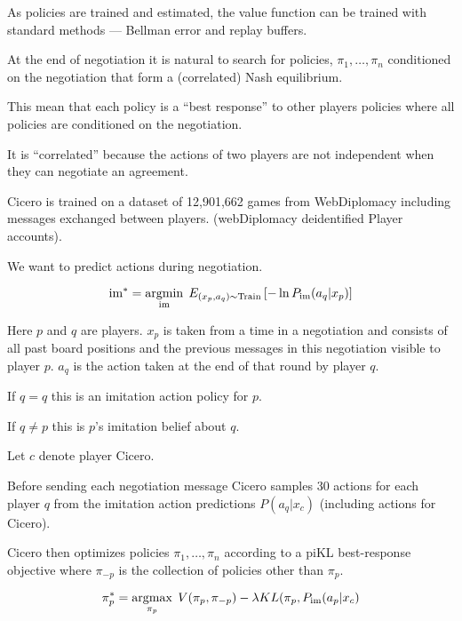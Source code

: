 {\vfill
As policies are trained and estimated, the value function can be trained with standard methods --- Bellman error and replay buffers.


\vfill
At the end of negotiation it is natural to search for policies, $\pi_1,\ldots,\pi_n$ conditioned on the negotiation
that form a (correlated) Nash equilibrium.

\vfill
This mean that each policy is a ``best response'' to other players policies where all policies are conditioned
on the negotiation.

\vfill
It is ``correlated'' because the actions of two players are not independent when they can negotiate an agreement.


Cicero is trained on a dataset of 12,901,662 games from WebDiplomacy including messages exchanged between players. (webDiplomacy deidentified Player accounts).


\newcommand{\act}{\mathrm{act}}
\newcommand{\mess}{\mathrm{mess}}
\newcommand{\im}{\mathrm{im}}


We want to predict actions during negotiation.

\vfill
$$\im^* = \argmin_\im\;E_{(x_p,a_q) \sim \train}\left[-\ln P_\im(a_q|x_p)\right]$$

\vfill
Here $p$ and $q$ are players. $x_p$ is taken from a time in a negotiation and
consists of all past board positions and the previous messages in this negotiation visible to player $p$.
$a_q$ is the action taken at the end of that round by player $q$.

\vfill
If $q = q$ this is an imitation action policy for $p$.

\vfill
If $q \ne p$ this is $p$'s imitation belief about $q$.


Let $c$ denote player Cicero.

\vfill
Before sending each negotiation message Cicero samples 30 actions for each player $q$
from the imitation action predictions $P(a_q|x_c)$ (including actions for Cicero).

\vfill
Cicero then optimizes policies $\pi_1,\ldots,\pi_n$ according to a piKL best-response objective
where $\pi_{-p}$ is the collection of policies other than $\pi_p$.

$$\pi_p^* = \argmax_{\pi_p}\;V(\pi_p,\pi_{-p}) - \lambda KL(\pi_p,P_\im(a_p|x_c)$$



}
